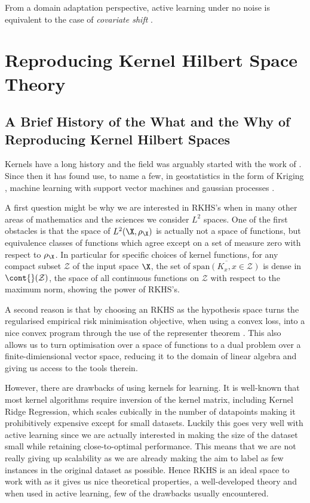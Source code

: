 From a domain adaptation perspective, active learning under no noise is
equivalent to the case of \emph{covariate shift}
\cite{gretton09_covar_shift_by_kernel_mean_match}.

\section{Reproducing Kernel Hilbert Space Theory}
\label{sec:rkhs-theory}

\subsection{A Brief History of the What and the Why of Reproducing Kernel
Hilbert Spaces}
\label{sec:a-brief-hisory-RKHS} Kernels have a long history and the field was
arguably started with the work of \cite{aronszajn50_theor_reprod_kernel}. Since
then it has found use, to name a few, in geostatistics in the form of Kriging
\cite{cressie90_origin_krigin}, machine learning with support vector machines
\cite{evgeniou99_suppor} and gaussian processes \cite{williams96_gauss}.

A first question might be why we are interested in RKHS's when in many other
areas of mathematics and the sciences we consider \(L^{2}\) spaces. One of the
first obstacles is that the space of \(L^{2}(\X, \rho_{\X})\) is actually not a
space of functions, but equivalence classes of functions which agree except on a
set of measure zero with respect to \(\rho_{\X}\). In particular for specific
choices of kernel functions, for any compact subset \(\mathcal{Z}\) of the input
space \(\X\), the set of \(\overline{\textrm{span}(K_x, x \in \mathcal{Z})}\) is
dense in \(\cont{}(\mathcal{Z})\), the space of all continuous functions on
\(\mathcal{Z}\) with respect to the maximum norm, showing the power of RKHS's.

A second reason is that by choosing an RKHS as the hypothesis space turns the
regularised empirical risk minimisation objective, when using a convex loss,
into a nice convex program through the use of the representer theorem
\cite["Large" Reproducing Kernel Hilbert
Spaces]{gretton18_advan_topic_machin_learn}. This also allows us to turn
optimisation over a space of functions to a dual problem over a
finite-dimiensional vector space, reducing it to the domain of linear algebra
and giving us access to the tools therein.

However, there are drawbacks of using kernels for learning. It is well-known
that most kernel algorithms require inversion of the kernel matrix, including
Kernel Ridge Regression, which scales cubically in the number of datapoints
\cite{saunders98_ridge_regres_learn_algor_dual_variab} making it prohibitively
expensive except for small datasets. Luckily this goes very well with active
learning since we are actually interested in making the size of the dataset
small while retaining close-to-optimal performance. This means that we are not
really giving up scalability as we are already making the aim to label as few
instances in the original dataset as possible. Hence RKHS is an ideal space to
work with as it gives us nice theoretical properties, a well-developed theory
and when used in active learning, few of the drawbacks usually encountered.

